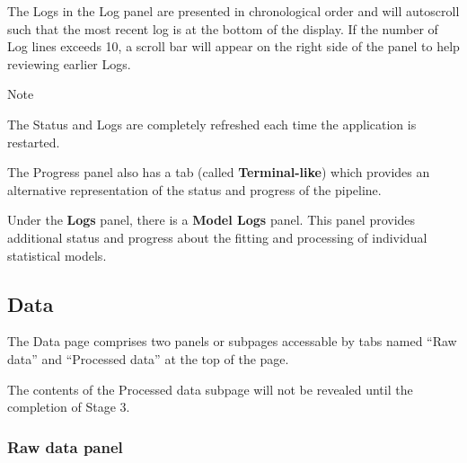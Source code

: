 \documentclass[
  8pt,
  a4paper]{article}
\begin{document}
The Logs in the Log panel are presented in chronological order and will
autoscroll such that the most recent log is at the bottom of the
display. If the number of Log lines exceeds 10, a scroll bar will appear
on the right side of the panel to help reviewing earlier Logs.

\begin{tcolorbox}[enhanced jigsaw, breakable, bottomrule=.15mm, toprule=.15mm, colback=white, opacityback=0, arc=.35mm, left=2mm, colframe=quarto-callout-color-frame, rightrule=.15mm, leftrule=.75mm]

Note

The Status and Logs are completely refreshed each time the application
is restarted.

\end{tcolorbox}

The Progress panel also has a tab (called \textbf{Terminal-like}) which
provides an alternative representation of the status and progress of the
pipeline.

Under the \textbf{Logs} panel, there is a \textbf{Model Logs} panel.
This panel provides additional status and progress about the fitting and
processing of individual statistical models.

\subsection{Data}\label{sec-data}

The Data page comprises two panels or subpages accessable by tabs named
``Raw data'' and ``Processed data'' at the top of the page.

\begin{tcolorbox}[enhanced jigsaw, breakable, rightrule=.15mm, toprule=.15mm, colbacktitle=quarto-callout-note-color!10!white, colframe=quarto-callout-note-color-frame, coltitle=black, bottomrule=.15mm, colback=white, opacityback=0, bottomtitle=1mm, left=2mm, title=\textcolor{quarto-callout-note-color}{\faInfo}\hspace{0.5em}{Note}, toptitle=1mm, titlerule=0mm, arc=.35mm, opacitybacktitle=0.6, leftrule=.75mm]

The contents of the Processed data subpage will not be revealed until
the completion of Stage 3.

\end{tcolorbox}

\subsubsection{Raw data panel}\label{raw-data-panel}
\end{document}
